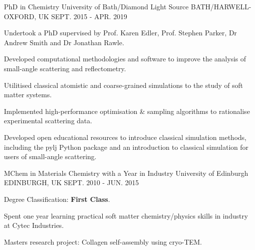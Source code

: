\begin{cventries}
  \cventry
    {PhD in Chemistry}
    {University of Bath/Diamond Light Source}
    {BATH/HARWELL-OXFORD, UK}
    {SEPT. 2015 - APR. 2019}
    {
      \begin{cvitems}
        \item {Undertook a PhD supervised by Prof. Karen Edler, Prof. Stephen Parker, Dr Andrew Smith and Dr Jonathan Rawle.}
        \item {Developed computational methodologies and software to improve the analysis of small-angle scattering and reflectometry.}
        \item {Utilitised classical atomistic and coarse-grained simulations to the study of soft matter systems.}
        \item {Implemented high-performance optimisation \& sampling algorithms to rationalise experimental scattering data.}
        \item {Developed open educational resources to introduce classical simulation methods, including the pylj Python package and an introduction to classical simulation for users of small-angle scattering.}
      \end{cvitems}
    }
  \cventry
    {MChem in Materials Chemistry with a Year in Industry}
    {University of Edinburgh}
    {EDINBURGH, UK}
    {SEPT. 2010 - JUN. 2015}
    {
      \begin{cvitems}
        \item {Degree Classification: \textbf{First Class}.}
        \item {Spent one year learning practical soft matter chemistry/physics skills in industry at Cytec Industries.}
        \item {Masters research project: Collagen self-assembly using cryo-TEM.}
      \end{cvitems}
    }
\end{cventries}
